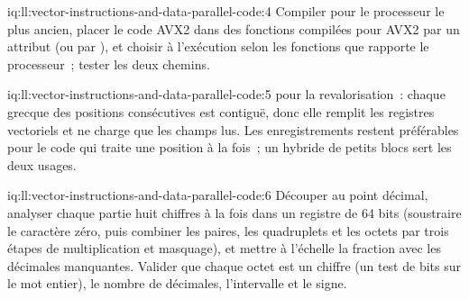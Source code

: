 \begin{solution}{iq:ll:vector-instructions-and-data-parallel-code:4}
Compiler pour le processeur le plus ancien, placer le code AVX2 dans des fonctions compilées pour AVX2 par un attribut (ou par ),
et choisir à l'exécution selon les fonctions que rapporte le processeur~; tester les deux chemins.
\end{solution}

\begin{solution}{iq:ll:vector-instructions-and-data-parallel-code:5}
 pour la revalorisation~: chaque grecque des positions consécutives est contiguë, donc elle remplit les registres vectoriels et
ne charge que les champs lus. Les enregistrements restent préférables pour le code qui traite une position à la fois~; un hybride de petits blocs
sert les deux usages.
\end{solution}

\begin{solution}{iq:ll:vector-instructions-and-data-parallel-code:6}
Découper au point décimal, analyser chaque partie huit chiffres à la fois dans un registre de 64 bits (soustraire le caractère zéro,
puis combiner les paires, les quadruplets et les octets par trois étapes de multiplication et masquage), et mettre à l'échelle la fraction avec les décimales manquantes.
Valider que chaque octet est un chiffre (un test de bits sur le mot entier), le nombre de décimales, l'intervalle et le signe.
\end{solution}
